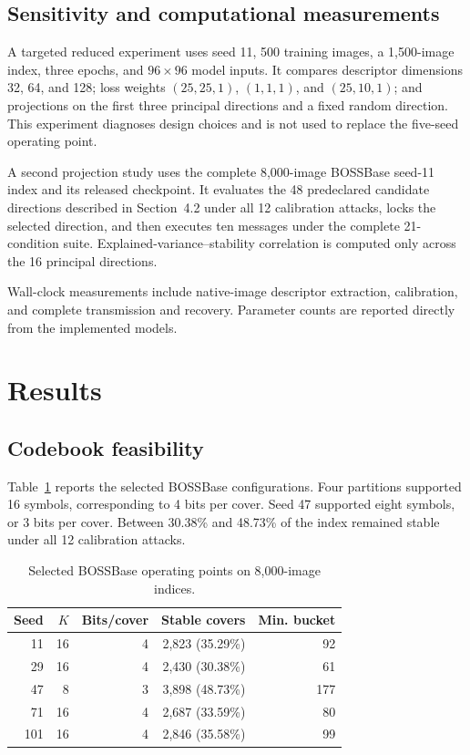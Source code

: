 ﻿\documentclass[a4paper,fleqn]{cas-dc}
\begin{document}
\subsection{Sensitivity and computational measurements}
\label{sec:sensitivity}

A targeted reduced experiment uses seed 11, 500 training images, a
1,500-image index, three epochs, and $96\times96$ model inputs. It compares
descriptor dimensions 32, 64, and 128; loss weights $(25,25,1)$, $(1,1,1)$,
and $(25,10,1)$; and projections on the first three principal directions and
a fixed random direction. This experiment diagnoses design choices and is not
used to replace the five-seed operating point.

A second projection study uses the complete 8,000-image BOSSBase seed-11
index and its released checkpoint. It evaluates the 48 predeclared candidate
directions described in Section~4.2 under all 12 calibration attacks, locks
the selected direction, and then executes ten messages under the complete
21-condition suite. Explained-variance--stability correlation is computed
only across the 16 principal directions.

Wall-clock measurements include native-image descriptor extraction,
calibration, and complete transmission and recovery. Parameter counts are
reported directly from the implemented models.

\section{Results}
\label{sec:results}

\subsection{Codebook feasibility}

Table~\ref{tab:config} reports the selected BOSSBase configurations. Four
partitions supported 16 symbols, corresponding to 4 bits per cover. Seed 47
supported eight symbols, or 3 bits per cover. Between 30.38\% and 48.73\% of
the index remained stable under all 12 calibration attacks.

\begin{table}[t]
\centering
\caption{Selected BOSSBase operating points on 8,000-image indices.}
\label{tab:config}
\begin{tabular}{rrrrr}
\toprule
Seed & $K$ & Bits/cover & Stable covers & Min. bucket\\
\midrule
11  & 16 & 4 & 2,823 (35.29\%) & 92\\
29  & 16 & 4 & 2,430 (30.38\%) & 61\\
47  & 8  & 3 & 3,898 (48.73\%) & 177\\
71  & 16 & 4 & 2,687 (33.59\%) & 80\\
101 & 16 & 4 & 2,846 (35.58\%) & 99\\
\bottomrule
\end{tabular}
\end{table}
\end{document}

